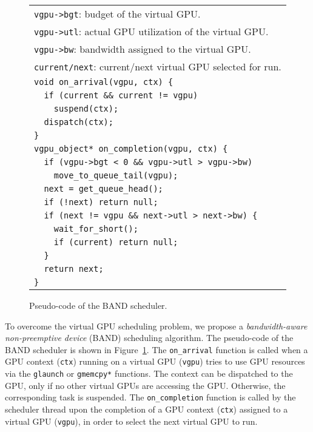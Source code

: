 \begin{figure}[t]
 \begin{center}
  \begin{tabular}{l}
   \hline
   {\small \verb|vgpu->bgt|: budget of the virtual GPU.}\\
   {\small \verb|vgpu->utl|: actual GPU utilization of the virtual GPU.}\\
   {\small \verb|vgpu->bw|: bandwidth assigned to the virtual
   GPU.}\\
   {\small \verb|current/next|: current/next virtual GPU selected for run.}\\
   \hline
   {\small \verb|void on_arrival(vgpu, ctx) {|}\\
   {\small \verb|  if (current && current != vgpu)|}\\
   {\small \verb|    suspend(ctx);|}\\
   {\small \verb|  dispatch(ctx);|}\\
   {\small \verb|}|}\\
   {\small \verb|vgpu_object* on_completion(vgpu, ctx) {|}\\
   {\small \verb|  if (vgpu->bgt < 0 && vgpu->utl > vgpu->bw)|}\\
   {\small \verb|    move_to_queue_tail(vgpu);|}\\
   {\small \verb|  next = get_queue_head();|}\\
   {\small \verb|  if (!next) return null;|}\\
   {\small \verb|  if (next != vgpu && next->utl > next->bw) {|}\\
   {\small \verb|    wait_for_short();|}\\
   {\small \verb|    if (current) return null;|}\\
   {\small \verb|  }|}\\
   {\small \verb|  return next;|}\\
   {\small \verb|}|}\\
   \hline
  \end{tabular}
  \caption{Pseudo-code of the BAND scheduler.}
  \label{fig:band}
 \end{center}
 \vspace{-1.7em}
\end{figure}

To overcome the virtual GPU scheduling problem, we propose a
\textit{bandwidth-aware non-preemptive device} (BAND) scheduling
algorithm.
The pseudo-code of the BAND scheduler is shown in
Figure~\ref{fig:band}.
The \texttt{on\_arrival} function is called when a GPU context
(\texttt{ctx}) running on a virtual GPU (\texttt{vgpu}) tries to use GPU
resources via the \texttt{glaunch} or \texttt{gmemcpy*} functions.
The context can be dispatched to the GPU, only if no other virtual GPUs
are accessing the GPU.
Otherwise, the corresponding task is suspended.
The \texttt{on\_completion} function is called by the scheduler thread
upon the completion of a GPU context (\texttt{ctx}) assigned to a virtual
GPU (\texttt{vgpu}), in order to select the next virtual GPU to run.

